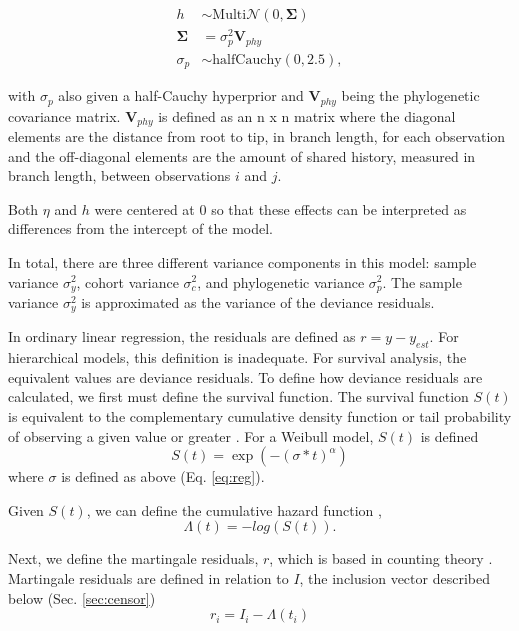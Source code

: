 \documentclass[12pt,letterpaper]{article}
\begin{document}
\begin{align*}
  h &\sim \mathrm{Multi}\mathcal{N}(0, \mathbf{\Sigma}) \\
  \mathbf{\Sigma} &= \sigma_{p}^{2} \mathbf{V}_{phy} \\
  \sigma_{p} &\sim \mathrm{halfCauchy}(0, 2.5),
\end{align*}
 
with \(\sigma_{p}\) also given a half-Cauchy hyperprior and \(\mathbf{V}_{phy}\) being the phylogenetic covariance matrix. \(\mathbf{V}_{phy}\) is defined as an n x n matrix where the diagonal elements are the distance from root to tip, in branch length, for each observation and the off-diagonal elements are the amount of shared history, measured in branch length, between observations \(i\) and \(j\).

Both \(\eta\) and \(h\) were centered at 0 so that these effects can be interpreted as differences from the intercept of the model. 

In total, there are three different variance components in this model: sample variance \(\sigma_{y}^{2}\), cohort variance \(\sigma_{c}^{2}\), and phylogenetic variance \(\sigma_{p}^{2}\). The sample variance \(\sigma_{y}^{2}\) is approximated as the variance of the deviance residuals.

In ordinary linear regression, the residuals are defined as \(r = y - y_{est}\). For hierarchical models, this definition is inadequate. For survival analysis, the equivalent values are deviance residuals. To define how deviance residuals are calculated, we first must define the survival function. The survival function \(S(t)\) is equivalent to the complementary cumulative density function or tail probability of observing a given value or greater \citep{Klein2003}. For a Weibull model, \(S(t)\) is defined
\begin{equation}
  S(t) = \exp(-(\sigma * t)^{\alpha})
\end{equation}
where \(\sigma\) is defined as above (Eq. \ref{eq:reg}).

Given \(S(t)\), we can define the cumulative hazard function \citep{Klein2003}, 
\begin{equation}
  \Lambda(t) = -log(S(t)).
\end{equation}

Next, we define the martingale residuals, \(r\), which is based in counting theory \citep{Therneau1990}. Martingale residuals are defined in relation to \(I\), the inclusion vector described below (Sec. \ref{sec:censor})
\begin{equation}
  r_{i} = I_{i} - \Lambda(t_i)
\end{equation}
\end{document}

